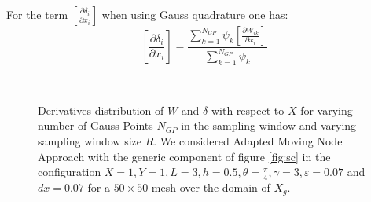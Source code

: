 For the term $\left[\frac{\partial \delta_i}{\partial x_i}\right]$ when using Gauss quadrature one has:
\begin{equation}
    \left[\frac{\partial \delta_i}{\partial x_i}\right]   = \frac{\sum_{k=1}^{N_{GP}}{\psi_k\left[\frac{\partial W_{ik}}{\partial x_i}\right]}}{\sum_{k=1}^{N_{GP}}\psi_k} 
\end{equation}
\begin{figure}[!ht]
\centering
    \quad
    \\
        \quad
        \caption{Derivatives distribution of $W$ and $\delta$ with respect to $X$ for varying number of Gauss Points $N_{GP}$ in the sampling window and varying sampling window size $R$. We considered Adapted Moving Node Approach with the generic component of figure \ref{fig:sc} in the configuration  $X=1,Y=1,L=3,h=0.5,\theta=\frac{\pi}{4}, \gamma=3, \varepsilon=0.07$ and  $dx=0.07$ for a $50\times50$ mesh over the domain of $X_g$.}%
    \label{fig:sens_text}%
\end{figure}
